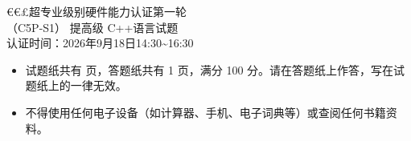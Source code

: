 \documentclass[a4paper]{ctexart}
\newcommand{\wdot}{{\fontsize{12}{12}\selectfont\textbullet}}
\begin{document}
\begin{center}
{\dengxian
{\fontsize{15.95}{1} €€£超专业级别硬件能力认证第一轮} \\[1.5em]
    {\fontsize{15.95}{1}\selectfont （C5P-S1） 提高级 C++\hspace{0pt}语言试题} \\[1.5em]
{\fontsize{14.05}{1}\selectfont 认证时间：2026年9月18日14:30\textasciitilde16:30}
}
\end{center}

\vspace{8pt}
\begin{itemize}[leftmargin=2.6em, itemsep=1pt, label={}]
  \item \wdot\hspace{0.5em}试题纸共有 \pageref{LastPage} 页，答题纸共有 1 页，满分 100 分。请在答题纸上作答，写在试题纸上的一律无效。
    \item \wdot\hspace{0.5em}不得使用任何电子设备（如计算器、手机、电子词典等）或查阅任何书籍资料。
\end{itemize}
\end{document}
